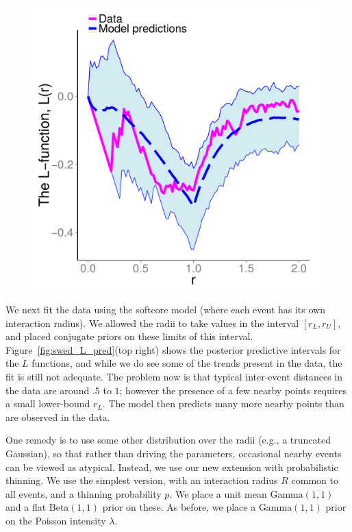 \documentclass{statsoc}
\begin{document}
\begin{figure}
\begin{minipage}[h]{0.6\linewidth}
\begin{minipage}[h]{0.49\linewidth}
  \end{minipage}
  \begin{minipage}[h]{0.49\linewidth}
  \centering
  \includegraphics[width=0.98\textwidth]{figs/swed_gibbs_Lfunc.pdf}
  \end{minipage}
  \end{minipage}
  \end{figure}
We next fit the data using the softcore model 
(where each \matern event has its own interaction radius). 
We allowed the radii to take values in the interval $[r_L,r_U]$, and placed conjugate priors on these limits of this interval.
Figure~\ref{fig:swed_L_pred}(top right) shows the posterior predictive intervals for the $L$ functions, and while we do see some of the trends present
in the data, the fit is still not adequate. The problem now is that typical inter-event distances in the data are around $.5$ to $1$; however the 
presence of a few nearby points requires a small lower-bound $r_L$. 
The model then predicts many more nearby points than are observed in the data.

One remedy is to use some other distribution over the radii (e.g., a truncated Gaussian),
so that rather than driving the \matern parameters, occasional nearby events can be viewed as atypical.
Instead, we use our new extension with probabilistic thinning. We use the simplest version,
with an interaction radius $R$ common to all \matern events, and a thinning probability $p$.
We place a unit mean $\text{Gamma}(1,1)$ %
and a flat $\text{Beta}(1,1)$ prior on these.
As before, we place a  $\text{Gamma}(1,1)$ prior on the Poisson intensity $\lambda$.
\end{document}

